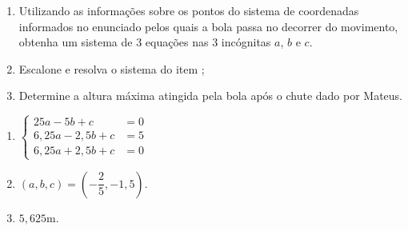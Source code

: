 \documentclass[10 pt,usenames,dvipsnames, oneside]{article}
\begin{document}
\begin{enumerate}
\item{}
Utilizando as informações sobre os pontos do sistema de coordenadas informados no enunciado pelos quais a bola passa no decorrer do movimento, obtenha um sistema de 3 equações nas 3 incógnitas $a$, $b$ e $c$.

\item{}
Escalone e resolva o sistema do item ;

\item{}
Determine a altura máxima atingida pela bola após o chute dado por Mateus.

\end{enumerate}

\ifdefined\prof
\begin{solucao}

\begin{enumerate}
\item 
$
\left \{
\begin{aligned}
25a-5b+c&=0\\
6{,}25a-2{,}5b+c&=5\\
6{,}25a+2{,}5b+c&=0
\end{aligned}
\right.
$
\item $(a,b,c)=(-\dfrac{2}{5},-1,5)$.
\item $5{,}625$m.
\end{enumerate}

\end{solucao}
\fi
\end{document}
